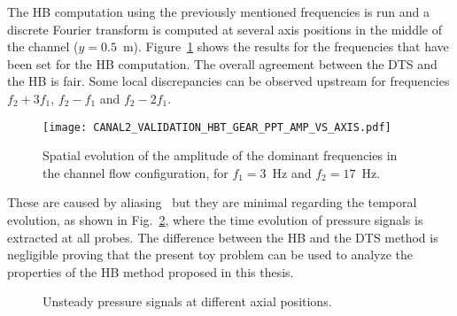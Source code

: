 The HB computation using the previously mentioned frequencies is
run and a discrete Fourier transform is computed at several axis positions
in the middle of the channel ($y=0.5$~m). Figure~\ref{fig:canal2_validation_hbt_gear_amp_vs_axis}
shows the results for the frequencies that have been set for the HB computation.
The overall agreement between the DTS and the HB is fair.  
Some local discrepancies can be
observed upstream for frequencies $f_2 + 3f_1$, $f_2 - f_1$ and $f_2 -
2f_1$. 
\begin{figure}[htb]
  \centering
  \texttt{[image: CANAL2\_VALIDATION\_HBT\_GEAR\_PPT\_AMP\_VS\_AXIS.pdf]}
  \caption{Spatial evolution of the amplitude of the dominant
    frequencies in the channel flow configuration, for $f_1 = 3$~Hz and $f_2 = 17$~Hz.}
  \label{fig:canal2_validation_hbt_gear_amp_vs_axis}
\end{figure}
These are caused by aliasing~
but they are minimal regarding the temporal evolution, as
shown in Fig.~\ref{fig:canal2_validation_hbt_gear_time_ev}, where the
time evolution of pressure signals is extracted at all probes.  The
difference between the HB and the DTS method is negligible proving
that the present toy problem can be used to analyze the properties of 
the HB method proposed in this thesis.
\begin{figure}[htb]
  \centering 
   \quad{}
  \caption{Unsteady pressure signals at different axial positions.}
  \label{fig:canal2_validation_hbt_gear_time_ev}
\end{figure}

